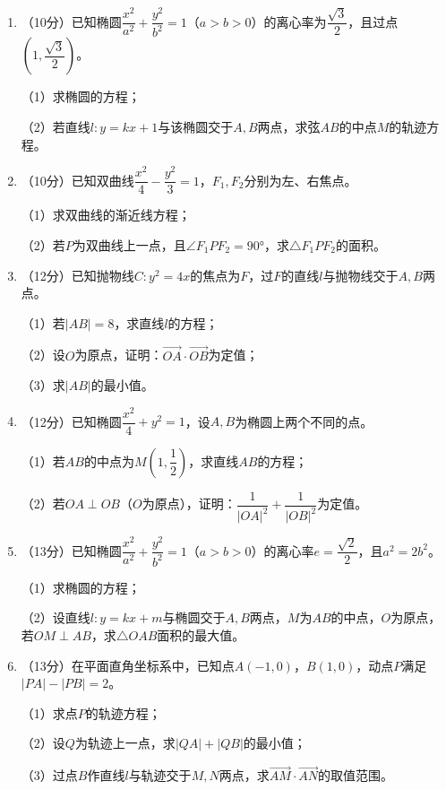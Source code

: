 \documentclass[12pt, a4paper]{ctexart}
\begin{document}
\begin{enumerate}[start=17]
\item （10分）已知椭圆$\dfrac{x^2}{a^2}+\dfrac{y^2}{b^2}=1$（$a>b>0$）的离心率为$\dfrac{\sqrt{3}}{2}$，且过点$(1,\dfrac{\sqrt{3}}{2})$。

（1）求椭圆的方程；

（2）若直线$l:y=kx+1$与该椭圆交于$A,B$两点，求弦$AB$的中点$M$的轨迹方程。

\item （10分）已知双曲线$\dfrac{x^2}{4}-\dfrac{y^2}{3}=1$，$F_1,F_2$分别为左、右焦点。

（1）求双曲线的渐近线方程；

（2）若$P$为双曲线上一点，且$\angle F_1PF_2=90°$，求$\triangle F_1PF_2$的面积。

\item （12分）已知抛物线$C:y^2=4x$的焦点为$F$，过$F$的直线$l$与抛物线交于$A,B$两点。

（1）若$|AB|=8$，求直线$l$的方程；

（2）设$O$为原点，证明：$\overrightarrow{OA}\cdot\overrightarrow{OB}$为定值；

（3）求$|AB|$的最小值。

\item （12分）已知椭圆$\dfrac{x^2}{4}+y^2=1$，设$A,B$为椭圆上两个不同的点。

（1）若$AB$的中点为$M(1,\dfrac{1}{2})$，求直线$AB$的方程；

（2）若$OA\perp OB$（$O$为原点），证明：$\dfrac{1}{|OA|^2}+\dfrac{1}{|OB|^2}$为定值。

\item （13分）已知椭圆$\dfrac{x^2}{a^2}+\dfrac{y^2}{b^2}=1$（$a>b>0$）的离心率$e=\dfrac{\sqrt{2}}{2}$，且$a^2=2b^2$。

（1）求椭圆的方程；

（2）设直线$l:y=kx+m$与椭圆交于$A,B$两点，$M$为$AB$的中点，$O$为原点，若$OM\perp AB$，求$\triangle OAB$面积的最大值。

\item （13分）在平面直角坐标系中，已知点$A(-1,0)$，$B(1,0)$，动点$P$满足$|PA|-|PB|=2$。

（1）求点$P$的轨迹方程；

（2）设$Q$为轨迹上一点，求$|QA|+|QB|$的最小值；

（3）过点$B$作直线$l$与轨迹交于$M,N$两点，求$\overrightarrow{AM}\cdot\overrightarrow{AN}$的取值范围。
\end{enumerate}
\end{document}
